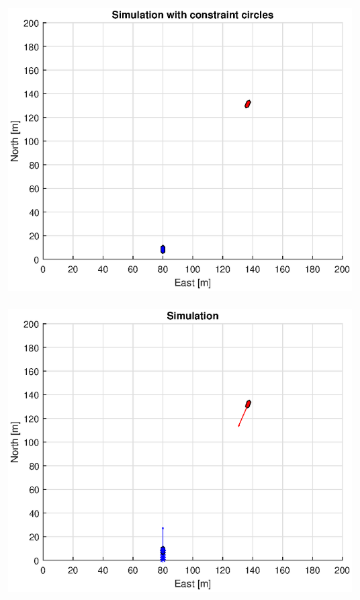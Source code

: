 \clearpage
\begin{figure}[!b] %
    \begin{subfigure}[b]{0.49\textwidth}
        \centering
        \includegraphics[width=\textwidth]{Images/Figures/sving_GW/Simple1_f1_Frame1}
    \end{subfigure}
    \hfill
    \begin{subfigure}[b]{0.499\textwidth}
        \centering
        \includegraphics[width=\textwidth]{Images/Figures/sving_GW/Simple1_f600_Frame1}

\end{subfigure}
\end{figure}
